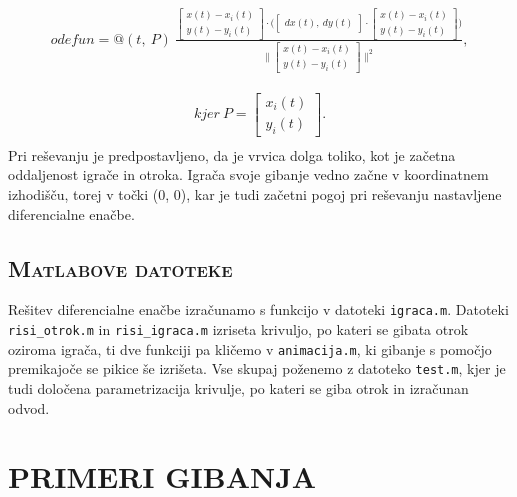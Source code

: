 \documentclass[a4paper,12pt]{article}
\begin{document}
\begin{align*}
    odefun = @(t,\ P) 
    \
    \frac{
        \begin{bmatrix} 
            x(t) - x_i(t) \\
            y(t) - y_i(t)
        \end{bmatrix}
        \cdot
        \Big(
        \begin{bmatrix} 
            dx(t), \ %
            dy(t)
        \end{bmatrix}
        \cdot
        \begin{bmatrix} 
            x(t) - x_i(t) \\
            y(t) - y_i(t)
        \end{bmatrix}
        \Big)
        }
        {
        \Big \|
        \begin{bmatrix} 
            x(t) - x_i(t) \\
            y(t) - y_i(t)
        \end{bmatrix}
        \Big \| ^ {2}
        },
\end{align*}

\begin{align*}
    kjer \ P = 
        \begin{bmatrix} 
            x_i(t) \\
            y_i(t)
        \end{bmatrix}
    .
    \\
\end{align*}
Pri reševanju je predpostavljeno, da je vrvica dolga toliko, kot je začetna oddaljenost igrače in otroka. 
Igrača svoje gibanje vedno začne v koordinatnem izhodišču, torej v točki (0, 0), kar je tudi začetni pogoj pri reševanju nastavljene diferencialne enačbe.

\subsection{\textsc{Matlabove datoteke}}

Rešitev diferencialne enačbe izračunamo s funkcijo v datoteki {\texttt{igraca.m}}. Datoteki {\texttt{risi\_otrok.m}} in {\texttt{risi\_igraca.m}} izriseta krivuljo, 
po kateri se gibata otrok oziroma igrača, ti dve funkciji pa kličemo v {\texttt{animacija.m}}, ki gibanje s pomočjo premikajoče se pikice še izrišeta. 
Vse skupaj poženemo z datoteko {\texttt{test.m}}, kjer je tudi določena parametrizacija krivulje, po kateri se giba otrok in izračunan odvod.

\newpage
\section{\textsc{\large{PRIMERI GIBANJA}}}
\end{document}
